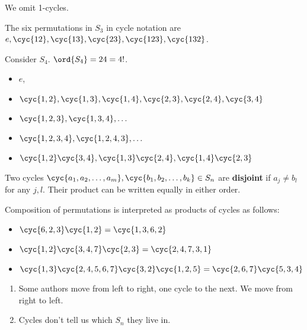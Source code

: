 We omit 1-cycles.

The six permutations in $S_3$ in cycle notation are $e, \cyc{12}, \cyc{13}, \cyc{23}, \cyc{123}, \cyc{132}$.

\begin{example}[cycles of $S_4$]
    Consider $S_4$. $\ord{S_4} = 24 = 4!$.
    \begin{itemize}
        \item $e$,
        \item $\cyc{1,2}, \cyc{1,3}, \cyc{1,4}, \cyc{2,3}, \cyc{2,4}, \cyc{3,4}$
        \item $\cyc{1,2,3}, \cyc{1,3,4}, \dots$
        \item $\cyc{1,2,3,4}, \cyc{1,2,4,3}, \dots$
        \item $\cyc{1,2}\cyc{3,4}, \cyc{1,3}\cyc{2,4}, \cyc{1,4}\cyc{2,3}$
    \end{itemize}
\end{example}

\begin{definition}
    Two cycles $\cyc{a_1, a_2, \dots, a_m}, \cyc{b_1, b_2, \dots, b_k} \in S_n$ are \textbf{disjoint} if $a_j \neq b_l$ for any $j, l$. Their product can be written equally in either order.
\end{definition}

Composition of permutations is interpreted as products of cycles as follows:

\begin{example}[compositions in $S_7$]
    \begin{itemize}
        \item $\cyc{6,2,3}\cyc{1,2} = \cyc{1,3,6,2}$
        \item $\cyc{1,2}\cyc{3,4,7}\cyc{2,3} = \cyc{2,4,7,3,1}$
        \item $\cyc{1,3}\cyc{2,4,5,6,7}\cyc{3,2}\cyc{1,2,5} = \cyc{2,6,7}\cyc{5,3,4}$
    \end{itemize}
\end{example}

\begin{remark}
    \begin{enumerate}
        \item Some authors move from left to right, one cycle to the next. We move from right to left.
        \item Cycles don't tell us which $S_n$ they live in.
    \end{enumerate}
\end{remark}

